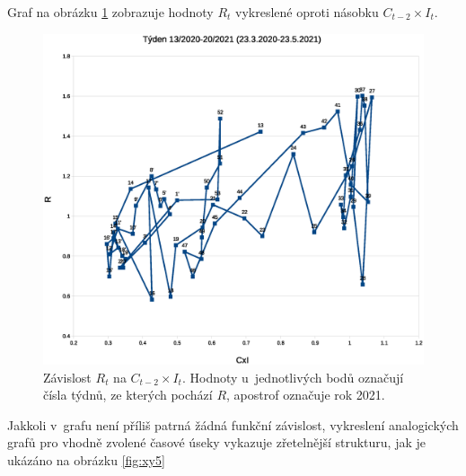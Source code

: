 Graf na obrázku \ref{fig:xy} zobrazuje hodnoty $R_{t}$ vykreslené oproti násobku
$C_{t-2}\times I_{t}$. 
\begin{figure}
\begin{center}
\includegraphics[scale=0.4]{pic/epi}
\caption{Závislost $R_t$ na $C_{t-2} \times I_t$. Hodnoty u~jednotlivých bodů označují čísla týdnů, ze kterých pochází $R$, apostrof označuje rok 2021.}
\label{fig:xy}
\end{center}
\end{figure}
Jakkoli v~grafu není příliš patrná žádná funkční závislost, vykreslení analogických grafů 
pro vhodně zvolené časové úseky vykazuje 
zřetelnější strukturu, jak je ukázáno na obrázku \ref{fig:xy5}
